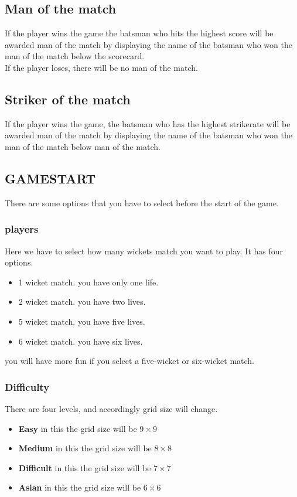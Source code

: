 \documentclass{article}
\begin{document}
\subsection{Man of the match}
If the player wins the game the batsman who hits the highest score will be awarded man of the match by displaying the name of the batsman who won the man of the match below the scorecard.\\
If the player loses, there will be no man of the match.
\subsection{Striker of the match}
If the player wins the game, the batsman who has the highest strikerate will be awarded man of the match by displaying the name of the batsman who won the man of the match below man of the match.
\subsection{GAMESTART}
There are some options that you have to select before the start of the game.
\subsubsection{players}
Here we have to select how many wickets match you want to play. It has four options.
\begin{itemize}
    \item 1 wicket match. you have only one life.
    \item 2 wicket match. you have two lives.
    \item 5 wicket match. you have five lives. 
    \item 6 wicket match. you have six lives. 
\end{itemize}
you will have more fun if you select a five-wicket or six-wicket match.
\subsubsection{Difficulty}
There are four levels, and accordingly grid size will change.
\begin{itemize}
    \item \textbf{Easy} in this the grid size will be $9\times9$
    \item \textbf{Medium} in this the grid size will be $8\times8$
    \item \textbf{Difficult} in this the grid size will be $7\times7$
    \item \textbf{Asian} in this the grid size will be $6\times6$
\end{itemize}
\end{document}
